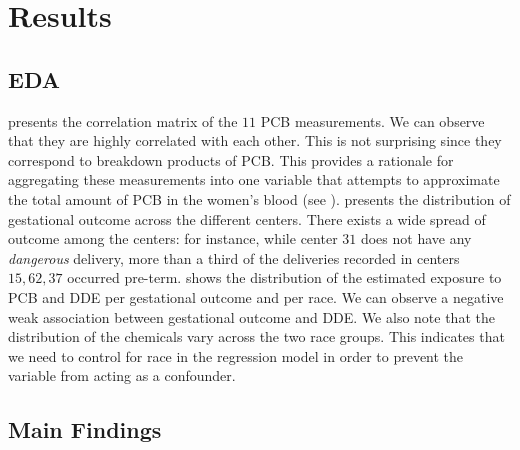 \documentclass[10pt]{jmlr}%
\begin{document}
\section{Results}
\label{sec:results}

\subsection{EDA}

 presents the correlation matrix of the $11$ PCB measurements. We can observe that they are highly correlated with each other. This is not surprising since they correspond to breakdown products of PCB. This provides a rationale for aggregating these measurements into one variable that attempts to approximate the total amount of PCB in the women's blood (see ).  presents the distribution of gestational outcome across the different centers. There exists a wide spread of outcome among the centers: for instance, while center $31$ does not have any \textit{dangerous} delivery, more than a third of the deliveries recorded in centers $15, 62, 37$ occurred pre-term.  shows the distribution of the estimated exposure to PCB and DDE per gestational outcome and per race. We can observe a negative weak association between gestational outcome and DDE. We also note that the distribution of the chemicals vary across the two race groups. This indicates that we need to control for race in the regression model in order to prevent the variable from acting as a confounder.


\subsection{Main Findings}
\end{document}
